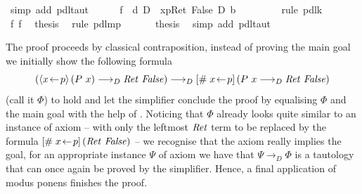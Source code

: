 \begin{isabellebody}
\ {\isacharparenleft}simp\ add{\isacharcolon}\ pdl{\isacharunderscore}taut{\isacharparenright}\isanewline
\ \ \ \ \isamarkupfalse%
\ f{}{\isacharcolon}\ {\isachardoublequote}{\isasymturnstile}\ {\isacharparenleft}{\isacharquery}d\ {\isasymlongrightarrow}\isactrlsub D\ {\isacharbrackleft}{\isacharhash}\ x{\isasymleftarrow}p{\isacharbrackright}{\isacharparenleft}Ret\ False{\isacharparenright}{\isacharparenright}\ {\isasymlongrightarrow}\isactrlsub D\ {\isacharquery}b{\isachardoublequote}\ \isanewline
\ \ \ \ \ \ \isamarkupfalse%
\ {\isacharparenleft}rule\ pdl{\isacharunderscore}k{}{\isacharparenright}\isanewline
\ \ \ \ \isamarkupfalse%
\ f{}\ f{}\ \isamarkupfalse%
\ {\isacharquery}thesis\ \isamarkupfalse%
\ {\isacharparenleft}rule\ pdl{\isacharunderscore}mp{\isacharparenright}\isanewline
\ \ \isamarkupfalse%
\isanewline
\ \ \isamarkupfalse%
\ {\isacharquery}thesis\ \isamarkupfalse%
\ {\isacharparenleft}simp\ add{\isacharcolon}\ pdl{\isacharunderscore}taut{\isacharparenright}\isanewline
\isamarkupfalse%
\isamarkupfalse%
\isanewline
\end{isabellebody}

The proof proceeds by classical contraposition, \IE instead of proving the
main goal we initially show the following formula
\[
(\langle x\!\gets\! p\rangle\,{(P\ x)} \longrightarrow_D \mathit{Ret}~\mathit{False}) \longrightarrow_D [\#\;x\!\gets\! p]\,{(P\ x
  \longrightarrow_D \mathit{Ret}~\mathit{False})}
\]
(call it $\Phi$) to hold and let the simplifier conclude the proof by equalising
$\Phi$ and the main goal with the help of . Noticing that $\Phi$
already looks quite similar to an instance of axiom  -- with only
the leftmost $\mathit{Ret}$ term to be replaced by the formula $[\#\;x\!\gets\!
  p]\,{(\mathit{Ret}~\mathit{False})}$ -- we recognise that the axiom really implies the goal,
\IE for an appropriate instance $\Psi$ of axiom  we have that $\Psi \longrightarrow_D
\Phi$ is a tautology that can once again be proved by the simplifier. Hence, a
final application of modus ponens finishes the proof.

